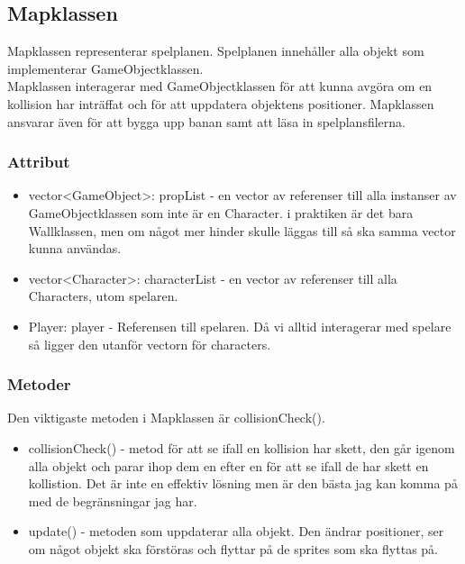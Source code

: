 \documentclass{TDP005mall}
\begin{document}
\newpage

\subsection{Mapklassen}
Mapklassen representerar spelplanen. Spelplanen innehåller alla objekt som implementerar GameObjectklassen. \\
Mapklassen interagerar med GameObjectklassen för att kunna avgöra om en kollision har inträffat och för att 
uppdatera objektens positioner. Mapklassen ansvarar även för att bygga upp banan samt att läsa in 
spelplansfilerna. \\
\subsubsection{Attribut}
\begin{itemize}
  \item vector<GameObject>: propList - en vector av referenser till alla instanser av GameObjectklassen som inte är en Character. 
  i praktiken är det bara Wallklassen, men om något mer hinder skulle läggas till så ska samma vector kunna användas.
  \item vector<Character>: characterList - en vector av referenser till alla Characters, utom spelaren.
  \item Player: player - Referensen till spelaren. Då vi alltid interagerar med spelare så ligger den utanför vectorn för characters.
\end{itemize}
\subsubsection{Metoder}
Den viktigaste metoden i Mapklassen är collisionCheck().
\begin{itemize}
  \item collisionCheck() - metod för att se ifall en kollision har skett, den går igenom alla objekt och parar ihop dem en efter en 
  för att se ifall de har skett en kollistion. Det är inte en effektiv lösning men är den bästa jag kan komma på med de begränsningar jag har.
  \item update() - metoden som uppdaterar alla objekt. Den ändrar positioner, ser om något objekt ska förstöras och flyttar på de sprites som ska 
  flyttas på.
\end{itemize}


\newpage
\end{document}
